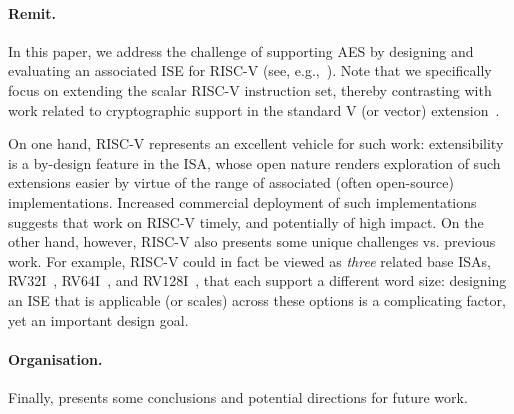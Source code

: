 
\paragraph{Remit.}

In this paper, we address the challenge of supporting AES by designing and
evaluating an associated ISE for RISC-V
(see, e.g.,~\cite{riscv:1,riscv:2}).
Note that we specifically focus on extending the scalar RISC-V instruction 
set, thereby contrasting with work related to cryptographic support in the
standard V (or vector) extension~\cite[Section 21]{RV:ISA:I:19}.

On one hand, 
RISC-V represents an excellent vehicle for such work:
extensibility is a by-design feature in the ISA, whose open nature renders
exploration of such extensions easier by virtue of the range of associated 
(often open-source) implementations.  
Increased commercial deployment of such implementations suggests that work 
on RISC-V timely, and potentially of high impact.
On the other hand, however,
RISC-V also presents some unique challenges vs. previous work.
For example,
RISC-V could in fact be viewed as {\em three} related base ISAs,
 RV32I~\cite[Section 2]{RV:ISA:I:19},
 RV64I~\cite[Section 5]{RV:ISA:I:19},
and
RV128I~\cite[Section 6]{RV:ISA:I:19},
that each support a different word size:
designing an ISE that is applicable (or scales) across these options is a
complicating factor, yet an important design goal.


\paragraph{Organisation.}


Finally, 
presents some conclusions and potential directions for future work.

%

